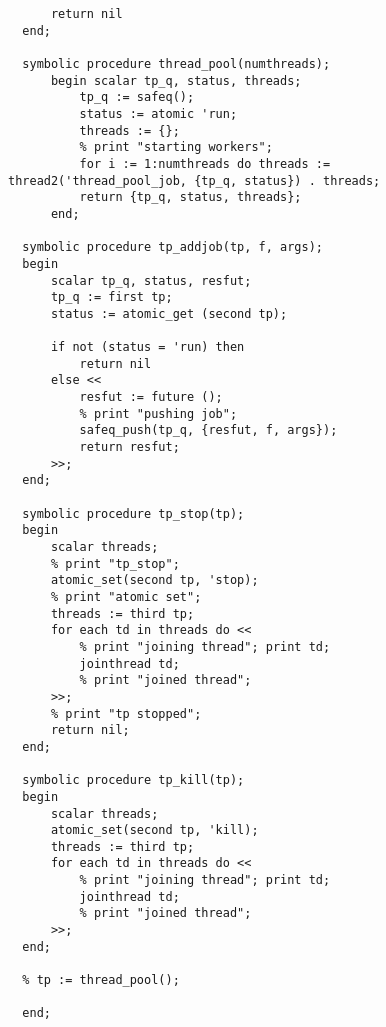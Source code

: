 \begin{verbatim}
      return nil
  end;

  symbolic procedure thread_pool(numthreads);
      begin scalar tp_q, status, threads;
          tp_q := safeq();
          status := atomic 'run;
          threads := {};
          % print "starting workers";
          for i := 1:numthreads do threads := thread2('thread_pool_job, {tp_q, status}) . threads;
          return {tp_q, status, threads};
      end;

  symbolic procedure tp_addjob(tp, f, args);
  begin
      scalar tp_q, status, resfut;
      tp_q := first tp;
      status := atomic_get (second tp);

      if not (status = 'run) then
          return nil
      else <<
          resfut := future ();
          % print "pushing job";
          safeq_push(tp_q, {resfut, f, args});
          return resfut;
      >>;
  end;

  symbolic procedure tp_stop(tp);
  begin
      scalar threads;
      % print "tp_stop";
      atomic_set(second tp, 'stop);
      % print "atomic set";
      threads := third tp;
      for each td in threads do <<
          % print "joining thread"; print td;
          jointhread td;
          % print "joined thread";
      >>;
      % print "tp stopped";
      return nil;
  end;

  symbolic procedure tp_kill(tp);
  begin
      scalar threads;
      atomic_set(second tp, 'kill);
      threads := third tp;
      for each td in threads do <<
          % print "joining thread"; print td;
          jointhread td;
          % print "joined thread";
      >>;
  end;

  % tp := thread_pool();

  end;
\end{verbatim}